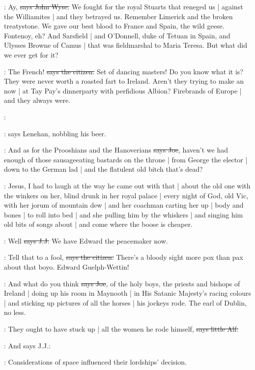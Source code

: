 \johnwyse:
Ay,
\sout{says John Wyse.}
We fought for the royal Stuarts that reneged us |
against the Williamites |
and they betrayed us.
Remember Limerick and the broken treatystone.
We gave our best blood to France and Spain,
the wild geese.
Fontenoy,
eh?
And Sarsfield |
and O'Donnell,
duke of Tetuan in Spain,
and Ulysses Browne of Camus |
that was fieldmarshal to Maria Teresa.
But what did we ever get for it?

\citizen:
The French!
\sout{says the citizen.}
Set of dancing masters!
Do you know what it is?
They were never worth a roasted fart to Ireland.
Aren't they trying to make an  now |
at Tay Pay's dinnerparty with perfidious Albion?
Firebrands of Europe |
and they always were.

\lenehan:

\Nq:
says Lenehan,
nobbling his beer.

\joe:
And as for the Prooshians and the Hanoverians
\sout{says Joe},
haven't we had enough of those sausageeating bastards on the throne |
from George the elector |
down to the German lad |
and the flatulent old bitch that's dead?

\Nq:
Jesus,
I had to laugh at the way he came out with that |
about the old one with the winkers on her,
blind drunk in her royal palace |
every night of God,
old Vic,
with her jorum of mountain dew |
and her coachman carting her up |
body and bones |
to roll into bed |
and she pulling him by the whiskers |
and singing him old bits of songs about  |
and come where the boose is cheaper.

\jjom:
Well
\sout{says J.J.}
We have Edward the peacemaker now.

\citizen:
Tell that to a fool,
\sout{says the citizen.}
There's a bloody sight more pox than pax about that boyo.
Edward Guelph-Wettin!

\joe:
And what do you think
\sout{says Joe},
of the holy boys,
the priests and bishops of Ireland |
doing up his room in Maynooth |
in His Satanic Majesty's racing colours |
and sticking up pictures of all the horses |
his jockeys rode.
The earl of Dublin,
no less.

\bergan:
They ought to have stuck up |
all the women he rode himself,
\sout{says little Alf.}

\Nq:
And says J.J.:

\jjom:
Considerations of space influenced their lordships' decision.

